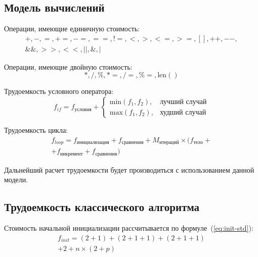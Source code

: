 \subsection{Модель вычислений}
\label{chap:cmp-model}
Операции, имеющие единичную стоимость:
\begin{equation}
    \label{eq:op-1}
    \begin{gathered}
        +, -, =, +=, -=, ==, !=, <, >, <=, >=, [], ++, {-}-,\\
        \&\&, >>, <<, ||, \&, |
    \end{gathered}
\end{equation}

Операции, имеющие двойную стоимость:
\begin{equation}
    \label{eq:op-2}
    *, /, \%, *=, /=, \%=, \text{len}()
\end{equation}

Трудоемкость условного оператора:
\begin{equation}
    \label{eq:if}
    f_{if} = f_{\text{условия}} + 
    \begin{cases}
        \text{min}(f_1, f_2), & \text{лучший случай}\\
        \text{max}(f_1, f_2), & \text{худший случай}
    \end{cases}
\end{equation}

Трудоемкость цикла:
\begin{equation}
    \label{eq:loop}
    \begin{gathered}
        f_{loop} = f_{\text{инициализация}} + f_{\text{сравнения}} + M_{\text{итераций}} \times (f_{\text{тело}} +\\
        + f_{\text{инкремент}} + f_{\text{сравнения}})
    \end{gathered}
\end{equation}

Дальнейший расчет трудоемкости будет производиться с использованием данной модели.

\subsection{Трудоемкость классического алгоритма}

Стоимость начальной инициализации рассчитывается по формуле~(\ref{eq:init-std}):
\begin{equation}
    \label{eq:init-std}
    \begin{gathered}
        f_{init} = (2 + 1) + (2 + 1 + 1) + (2 + 1 + 1) \\
        + 2 + n \times (2 + p)
    \end{gathered} 
\end{equation}

